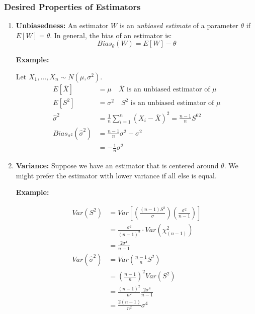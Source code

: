 \documentclass{article}
\begin{document}
\subsubsection{Desired Properties of Estimators}
\begin{enumerate}
    \item \textbf{Unbiasedness:} An estimator $W$ is an \textit{unbiased estimate} of a parameter $\theta$ if $E[W] = \theta$. In general, the bias of an estimator is:
    \begin{equation*}
        Bias_\theta(W) = E[W] - \theta
    \end{equation*}

    \textbf{Example:}

    Let $X_1,...,X_n \sim N(\mu,\sigma^2)$.
    \begin{equation*}
        \begin{split}
            E[\overline{X}] &= \mu \quad \overline{X} \text{ is an unbiased estimator of $\mu$}\\
            E[S^2] &= \sigma^2 \quad S^2 \text{ is an unbiased estimator of $\mu$}\\
            \hat{\sigma}^2 &= \frac{1}{n}\sum_{i=1}^n (X_i - \overline{X})^2 = \frac{n-1}{n}S^62\\
            Bias_{\sigma^2}(\hat{\sigma}^2) &= \frac{n-1}{n}\sigma^2 - \sigma^2\\
            &= -\frac{1}{n}\sigma^2
        \end{split}
    \end{equation*}


    \item \textbf{Variance:} Suppose we have an estimator that is centered around $\theta$. We might prefer the estimator with lower variance if all else is equal.

    \textbf{Example:}

    \begin{equation*}
        \begin{split}
            Var\left(S^2 \right) &= Var\left[ \left(\frac{(n-1)S^2}{\sigma}\right) \left(\frac{\sigma^2}{n-1} \right) \right] \\
            &= \frac{\sigma^2}{(n-1)^2}\cdot Var\left(\chi^2_{(n-1)}\right)\\
            &= \frac{2\sigma^4}{n-1}\\
            Var(\hat{\sigma}^2) &= Var\left(\frac{n-1}{n}S^2 \right)\\
            &= \left(\frac{n-1}{n}\right)^2 Var(S^2)\\
            &= \frac{(n-1)^2}{n^2}\frac{2\sigma^4}{n-1}\\
            &= \frac{2(n-1)}{n^2}\sigma^4
        \end{split}
    \end{equation*}



\end{enumerate}
\end{document}
